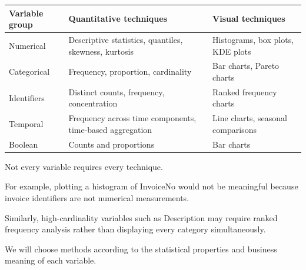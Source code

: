 \documentclass[11pt]{article}
\begin{document}
{\def\LTcaptype{none} %
\begin{longtable}[]{@{}
  >{\raggedright\arraybackslash}p{}
  >{\raggedright\arraybackslash}p{}
  >{\raggedright\arraybackslash}p{}@{}}
\toprule\noalign{}
\begin{minipage}[b]{\linewidth}\raggedright
Variable group
\end{minipage} & \begin{minipage}[b]{\linewidth}\raggedright
Quantitative techniques
\end{minipage} & \begin{minipage}[b]{\linewidth}\raggedright
Visual techniques
\end{minipage} \\
\midrule\noalign{}
\endhead
\bottomrule\noalign{}
\endlastfoot
Numerical & Descriptive statistics, quantiles, skewness, kurtosis &
Histograms, box plots, KDE plots \\
Categorical & Frequency, proportion, cardinality & Bar charts, Pareto
charts \\
Identifiers & Distinct counts, frequency, concentration & Ranked
frequency charts \\
Temporal & Frequency across time components, time-based aggregation &
Line charts, seasonal comparisons \\
Boolean & Counts and proportions & Bar charts \\
\end{longtable}
}

Not every variable requires every technique.

For example, plotting a histogram of InvoiceNo would not be meaningful
because invoice identifiers are not numerical measurements.

Similarly, high-cardinality variables such as Description may require
ranked frequency analysis rather than displaying every category
simultaneously.

We will choose methods according to the statistical properties and
business meaning of each variable.
\end{document}
